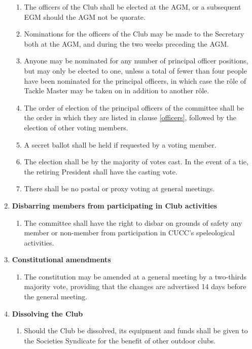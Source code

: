 \documentclass[a4paper,11pt]{article}
\begin{document}
\begin{enumerate}
\begin{enumerate}
\item The officers of the Club shall be elected at the AGM, or a subsequent EGM
should the AGM not be quorate. 

\item Nominations for the officers of the Club may be made to the Secretary
both at the AGM, and during the two weeks preceding the AGM. 

\item Anyone may be nominated for any number of principal officer positions,
but may only be elected to one, unless a total of fewer than four people
have been nominated for the principal officers, in which case the r\^ole of
Tackle Master may be taken on in addition to another r\^ole.

\item The order of election of the principal officers of the committee shall be
the order in which they are listed in clause \ref{officers}, followed by the election of
other voting members. 

\item A secret ballot shall be held if requested by a voting member. 

\item The election shall be by the majority of votes cast. In the event of a
tie, the retiring President shall have the casting vote. 

\item There shall be no postal or proxy voting at general meetings.

\end{enumerate}

\item {\bf Disbarring members from participating in Club activities}
\begin{enumerate}

\item The committee shall have the right to disbar on grounds of safety any
member or non-member from participation in CUCC's speleological activities. 

\end{enumerate}

\item {\bf Constitutional amendments}
\begin{enumerate}

\item The constitution may be amended at a general meeting by a two-thirds
majority vote, providing that the changes are advertised 14 days before the
general meeting. 

\end{enumerate}

\item {\bf Dissolving the Club}
\begin{enumerate}

\item Should the Club be dissolved, its equipment and funds shall be given to
the Societies Syndicate for the benefit of other outdoor clubs.

\end{enumerate}
\end{enumerate}

\hrulefill
\end{document}
